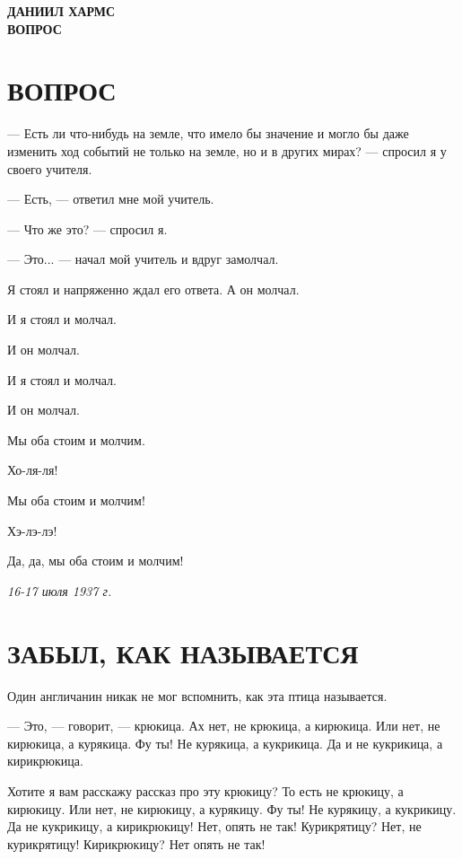 \documentclass[a4paper,12pt]{article}
\begin{document}
\begin{center}
    {\Huge \textbf{ДАНИИЛ ХАРМС}} \\[1.5cm]
    {\huge \textbf{ВОПРОС}} \\[0.5cm]
\end{center}

\section*{ВОПРОС}

— Есть ли что-нибудь на земле, что имело бы значение и могло бы даже изменить ход событий не только на земле, но и в других мирах? — спросил я у своего учителя.

— Есть, — ответил мне мой учитель.

— Что же это? — спросил я.

— Это... — начал мой учитель и вдруг замолчал.

Я стоял и напряженно ждал его ответа. А он молчал.

И я стоял и молчал.

И он молчал.

И я стоял и молчал.

И он молчал.

Мы оба стоим и молчим.

Хо-ля-ля!

Мы оба стоим и молчим!

Хэ-лэ-лэ!

Да, да, мы оба стоим и молчим!

\begin{flushright}
\textit{16-17 июля 1937 г.}
\end{flushright}

\vspace{1cm}

\section*{ЗАБЫЛ, КАК НАЗЫВАЕТСЯ}

Один англичанин никак не мог вспомнить, как эта птица называется.

— Это, — говорит, — крюкица. Ах нет, не крюкица, а кирюкица. Или нет, не кирюкица, а курякица. Фу ты! Не курякица, а кукрикица. Да и не кукрикица, а кирикрюкица.

Хотите я вам расскажу рассказ про эту крюкицу? То есть не крюкицу, а кирюкицу. Или нет, не кирюкицу, а курякицу. Фу ты! Не курякицу, а кукрикицу. Да не кукрикицу, а кирикрюкицу! Нет, опять не так! Курикрятицу? Нет, не курикрятицу! Кирикрюкицу? Нет опять не так!
\end{document}
